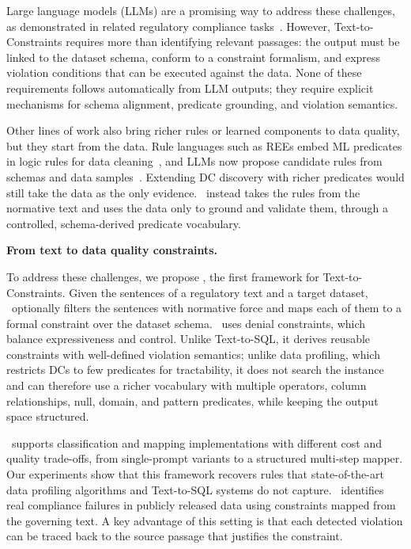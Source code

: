 Large language models (LLMs) are a promising way to address these challenges, as demonstrated in related regulatory compliance tasks~\cite{compliance2025ACMTSEM}. However, Text-to-Constraints requires more than identifying relevant passages: the output must be linked to the dataset schema, conform to a constraint formalism, and express violation conditions that can be executed against the data. None of these requirements follows automatically from LLM outputs; they require explicit mechanisms for schema alignment, predicate grounding, and violation semantics.

Other lines of work also bring richer rules or learned components to data quality, but they start from the data. Rule languages such as REEs embed ML predicates in logic rules for data cleaning~\cite{bao2024rock}, and LLMs now propose candidate rules from schemas and data samples~\cite{biester2024llmclean,glock2026ledqer}. Extending DC discovery with richer predicates would still take the data as the only evidence. \system\ instead takes the rules from the normative text and uses the data only to ground and validate them, through a controlled, schema-derived predicate vocabulary.

\smallskip
\noindent\textbf{From text to data quality constraints.}

To address these challenges, we propose \system, the first framework for Text-to-Constraints. Given the sentences of a regulatory text and a target dataset, \system\ optionally filters the sentences with normative force and maps each of them to a formal constraint over the dataset schema. \system\ uses denial constraints, which balance expressiveness and control. Unlike Text-to-SQL, it derives reusable constraints with well-defined violation semantics; unlike data profiling, which restricts DCs to few predicates for tractability, it does not search the instance and can therefore use a richer vocabulary with multiple operators, column relationships, null, domain, and pattern predicates, while keeping the output space structured.

\system\ supports classification and mapping implementations with different cost and quality trade-offs, from single-prompt variants to a structured multi-step mapper. Our experiments show that this framework recovers rules that state-of-the-art data profiling algorithms and Text-to-SQL systems do not capture. \system\ identifies real compliance failures in publicly released data using constraints mapped from the governing text. A key advantage of this setting is that each detected violation can be traced back to the source passage that justifies the constraint.

